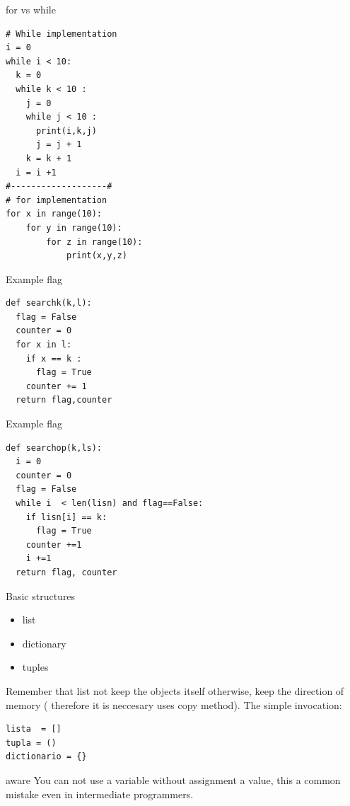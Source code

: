 \documentclass{beamer}
\begin{document}
\begin{frame}[fragile]{for vs while}
\begin{lstlisting}
# While implementation
i = 0
while i < 10:
  k = 0 
  while k < 10 :
    j = 0
    while j < 10 :
      print(i,k,j)
      j = j + 1
    k = k + 1
  i = i +1 
#-------------------#  
# for implementation
for x in range(10):
	for y in range(10):
		for z in range(10):
			print(x,y,z)
\end{lstlisting}
\end{frame}



\begin{frame}[fragile]{Example flag}
\begin{lstlisting}
def searchk(k,l):
  flag = False
  counter = 0
  for x in l:
    if x == k :
      flag = True
    counter += 1
  return flag,counter
\end{lstlisting}
\end{frame}

\begin{frame}[fragile]{Example flag}
\begin{lstlisting}
def searchop(k,ls):
  i = 0
  counter = 0
  flag = False 
  while i  < len(lisn) and flag==False:
    if lisn[i] == k:
      flag = True
    counter +=1
    i +=1
  return flag, counter
\end{lstlisting}

\end{frame}





\begin{frame}[fragile]{Basic structures}
\begin{itemize}
\item list
\item dictionary 
\item tuples
\end{itemize}
Remember that list not keep the objects itself otherwise, keep the direction of memory ( therefore it is neccesary uses copy method).
The simple invocation:
\begin{lstlisting}
lista  = []
tupla = ()
dictionario = {}
\end{lstlisting}
\end{frame}


\begin{frame}{aware}
You can not use a variable without assignment a value, this a common mistake even in intermediate programmers.

\end{frame}
\end{document}
